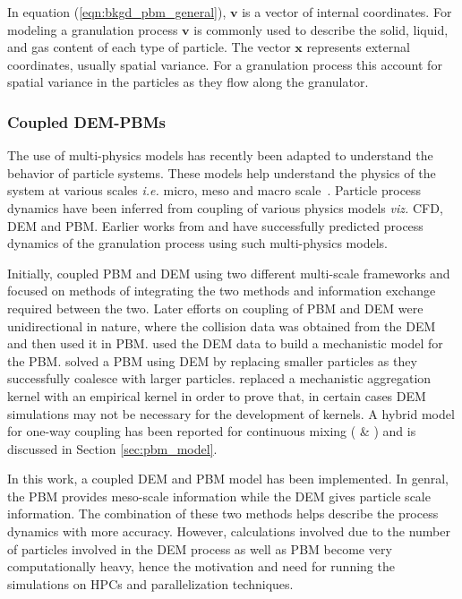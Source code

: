 \documentclass[preprint,11pt,authoryear]{elsarticle}
\begin{document}
In equation (\ref{eqn:bkgd_pbm_general}), $\textbf{v}$ is a vector of internal coordinates. For 
modeling a granulation process $\textbf{v}$ is commonly used to describe the solid, liquid, and gas 
content of each type of particle. The vector $\textbf{x}$ represents external coordinates, usually 
spatial variance. For a granulation process this  account for spatial variance in the particles as they 
flow along the granulator.

\subsubsection{Coupled DEM-PBMs}
The use of multi-physics models has recently been adapted to understand the behavior of 
particle systems. These models help understand the physics of the system at various scales 
\textit{i.e.} micro, meso and macro scale~\citep{sen2014}. Particle process dynamics have been 
inferred from coupling of various physics models \textit{viz.} CFD, 
DEM and PBM. Earlier works from \cite{sen2014} and \cite{Barrasso2015cerd} have successfully 
predicted process dynamics of the granulation process using such multi-physics models.

Initially, \cite{ingram2005} coupled PBM and DEM using two different multi-scale frameworks and 
focused on methods of integrating the two methods and information exchange required between the 
two. Later efforts on coupling of PBM and DEM were unidirectional in nature, where the collision 
data was obtained from the DEM and then used it in PBM. \cite{gantt2006} used the DEM data 
to build a mechanistic model for the PBM. \cite{Goldschmidt2003} solved a PBM using DEM by 
replacing smaller particles as they successfully coalesce with larger particles. 
\cite{Reinhold2012} replaced a mechanistic aggregation kernel with an empirical kernel 
in order to prove that, in certain cases DEM simulations may not be necessary for the 
development of kernels. A hybrid model for one-way coupling has been reported for continuous mixing (\cite{sen2013} \&  
\cite{sen2013b}) and is discussed in Section \ref{sec:pbm_model}.

In this work, a coupled DEM and PBM model has been implemented. In genral, the PBM provides meso-scale 
information while the DEM gives particle scale information. The combination of these two methods helps 
describe the process dynamics with more accuracy. However, calculations involved due to the number 
of particles involved in the DEM process as well as PBM become very computationally heavy, hence the
motivation and need for running the simulations on HPCs and parallelization techniques. 
 
\end{document}
